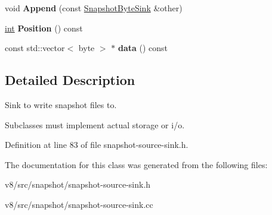 \begin{DoxyCompactItemize}
\mbox{\label{classv8_1_1internal_1_1SnapshotByteSink_a92309d26c0866c54215054074fb44079}} 
void {\bfseries Append} (const \mbox{\hyperlink{classv8_1_1internal_1_1SnapshotByteSink}{Snapshot\+Byte\+Sink}} \&other)
\item 
\mbox{\label{classv8_1_1internal_1_1SnapshotByteSink_abf237b5f3107f50f0a0135296b81a547}} 
\mbox{\hyperlink{classint}{int}} {\bfseries Position} () const
\item 
\mbox{\label{classv8_1_1internal_1_1SnapshotByteSink_ad2a9ae7a3ffbb6c41ec4c7daa1dcb719}} 
const std\+::vector$<$ byte $>$ $\ast$ {\bfseries data} () const
\end{DoxyCompactItemize}


\subsection{Detailed Description}
Sink to write snapshot files to.

Subclasses must implement actual storage or i/o. 

Definition at line 83 of file snapshot-\/source-\/sink.\+h.



The documentation for this class was generated from the following files\+:\begin{DoxyCompactItemize}
\item 
v8/src/snapshot/snapshot-\/source-\/sink.\+h\item 
v8/src/snapshot/snapshot-\/source-\/sink.\+cc\end{DoxyCompactItemize}
